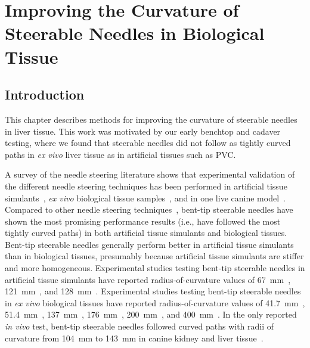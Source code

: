 \chapter[Improving Needle Curvature]{Improving the Curvature of Steerable Needles in Biological Tissue}

\section{Introduction}
This chapter describes methods for improving the curvature of steerable needles in liver tissue. This work was motivated by our early benchtop and cadaver testing, where we found that steerable needles did not follow as tightly curved paths in \textit{ex vivo} liver tissue as in artificial tissues such as PVC. 

A survey of the needle steering literature shows that experimental validation of the different needle steering techniques has been performed in artificial tissue simulants~\cite{DiMaio2005,Mallapragada2009,Okazawa2005,Ko2013,Patil2014,Swaney2013,Ayvali2012,Datla2014,Ryu2014,Rucker2013,vandeBerg2015}, \textit{ex vivo} biological tissue samples~\cite{Glozman2007,Burdette2010,Patil2014,Swaney2013,Majewicz2012,Rucker2013}, and in one live canine model~\cite{Majewicz2012}. Compared to other needle steering techniques~\cite{DiMaio2005,Mallapragada2009,Okazawa2005,Ko2013,Ryu2014}, bent-tip steerable needles have shown the most promising performance results (i.e., have followed the most tightly curved paths) in both artificial tissue simulants and biological tissues. Bent-tip steerable needles generally perform better in artificial tissue simulants than in biological tissues, presumably because artificial tissue simulants are stiffer and more homogeneous. Experimental studies testing bent-tip steerable needles in artificial tissue simulants have reported radius-of-curvature values of 67~mm~\cite{Patil2014}, 121~mm~\cite{Swaney2013}, and 128~mm~\cite{Rucker2013}. Experimental studies testing bent-tip steerable needles in \textit{ex vivo} biological tissues have reported radius-of-curvature values of 41.7~mm~\cite{Majewicz2010}, 51.4~mm~\cite{Adebar2014}, 137~mm~\cite{Patil2014}, 176~mm~\cite{Swaney2013}, 200~mm~\cite{Majewicz2012}, and 400~mm~\cite{Rucker2013}. In the only reported \textit{in vivo} test, bent-tip steerable needles followed curved paths with radii of curvature from 104~mm to 143~mm in canine kidney and liver tissue~\cite{Majewicz2012}.

